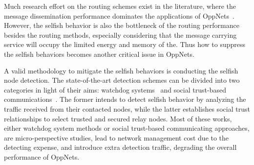 Much research effort on the routing schemes 
exist in the literature,
where the message dissemination performance 
dominates the applications of
OppNets~\cite{DBLP:conf/sigcomm/SouzaMSMCC16,
DBLP:conf/mobicom/RadenkovicH17,
DBLP:journals/comsur/JedariXN18,
DBLP:journals/tmc/LoretiB20}.
However, the selfish behavior is also 
the bottleneck of the routing performance besides the routing methods,
especially considering that
the message carrying service will occupy 
the limited energy and memory of the.
Thus how to suppress the selfish behaviors
becomes another critical issue in OppNets.

A valid methodology to mitigate the selfish behaviors 
is conducting the selfish node detection.
The state-of-the-art detection schemes 
can be divided into two categories
in light of their aims:
watchdog systems~\cite{DBLP:conf/mobicom/MartiGLB00,
DBLP:journals/tmc/Hernandez-Orallo15,
DBLP:journals/tie/DiasRXM15,
DBLP:journals/fgcs/JedariXCDTA19}
and social trust-based communications~\cite{DBLP:journals/tpds/ZhuDGDC14,
DBLP:journals/tdsc/ChoC18,
DBLP:journals/tmc/ChoiSLW12}.
The former intends to detect selfish behavior
by analyzing the traffic received
from their contacted nodes,
while the latter establishes social trust relationships
to select trusted and secured relay nodes.
Most of these works,
either watchdog system methods
or social trust-based communicating approaches,
are micro-perspective studies,
lead to network management cost
due to the detecting expense,
and introduce extra detection traffic,
degrading the overall performance of OppNets.

